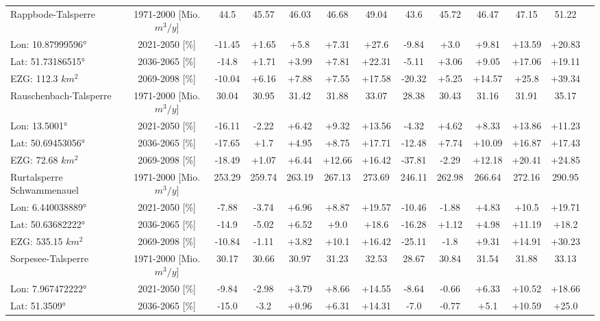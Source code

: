 \begin{longtable}{@{\extracolsep{\fill}}lc|ccccc||cccccc}
\hline 
Rappbode-Talsperre & 1971-2000 [Mio. $m^3/y$]  & 44.5 & 45.57 & 46.03 & 46.68 & 49.04 & 43.6 & 45.72 & 46.47 & 47.15 & 51.22 & \\ 
\cline{2-13} 
Lon: 10.87999596° & 2021-2050 [\%]  & -11.45 & +1.65 & +5.8 & +7.31 & +27.6 & -9.84 & +3.0 & +9.81 & +13.59 & +20.83 & \\ 
Lat: 51.73186515° & 2036-2065 [\%]  & -14.8 & +1.71 & +3.99 & +7.81 & +22.31 & -5.11 & +3.06 & +9.05 & +17.06 & +19.11 & \\ 
EZG: 112.3 $km^2$ & 2069-2098 [\%]  & -10.04 & +6.16 & +7.88 & +7.55 & +17.58 & -20.32 & +5.25 & +14.57 & +25.8 & +39.34 & \\ 
\hline 
Rauschenbach-Talsperre & 1971-2000 [Mio. $m^3/y$]  & 30.04 & 30.95 & 31.42 & 31.88 & 33.07 & 28.38 & 30.43 & 31.16 & 31.91 & 35.17 & \\ 
\cline{2-13} 
Lon: 13.5001° & 2021-2050 [\%]  & -16.11 & -2.22 & +6.42 & +9.32 & +13.56 & -4.32 & +4.62 & +8.33 & +13.86 & +11.23 & \\ 
Lat: 50.69453056° & 2036-2065 [\%]  & -17.65 & +1.7 & +4.95 & +8.75 & +17.71 & -12.48 & +7.74 & +10.09 & +16.87 & +17.43 & \\ 
EZG: 72.68 $km^2$ & 2069-2098 [\%]  & -18.49 & +1.07 & +6.44 & +12.66 & +16.42 & -37.81 & -2.29 & +12.18 & +20.41 & +24.85 & \\ 
\hline 
Rurtalsperre Schwammenauel & 1971-2000 [Mio. $m^3/y$]  & 253.29 & 259.74 & 263.19 & 267.13 & 273.69 & 246.11 & 262.98 & 266.64 & 272.16 & 290.95 & \\ 
\cline{2-13} 
Lon: 6.440038889° & 2021-2050 [\%]  & -7.88 & -3.74 & +6.96 & +8.87 & +19.57 & -10.46 & -1.88 & +4.83 & +10.5 & +19.71 & \\ 
Lat: 50.63682222° & 2036-2065 [\%]  & -14.9 & -5.02 & +6.52 & +9.0 & +18.6 & -16.28 & +1.12 & +4.98 & +11.19 & +18.2 & \\ 
EZG: 535.15 $km^2$ & 2069-2098 [\%]  & -10.84 & -1.11 & +3.82 & +10.1 & +16.42 & -25.11 & -1.8 & +9.31 & +14.91 & +30.23 & \\ 
\hline 
Sorpesee-Talsperre & 1971-2000 [Mio. $m^3/y$]  & 30.17 & 30.66 & 30.97 & 31.23 & 32.53 & 28.67 & 30.84 & 31.54 & 31.88 & 33.13 & \\ 
\cline{2-13} 
Lon: 7.967472222° & 2021-2050 [\%]  & -9.84 & -2.98 & +3.79 & +8.66 & +14.55 & -8.64 & -0.66 & +6.33 & +10.52 & +18.66 & \\ 
Lat: 51.3509° & 2036-2065 [\%]  & -15.0 & -3.2 & +0.96 & +6.31 & +14.31 & -7.0 & -0.77 & +5.1 & +10.59 & +25.0 & \\ 

\end{longtable}
